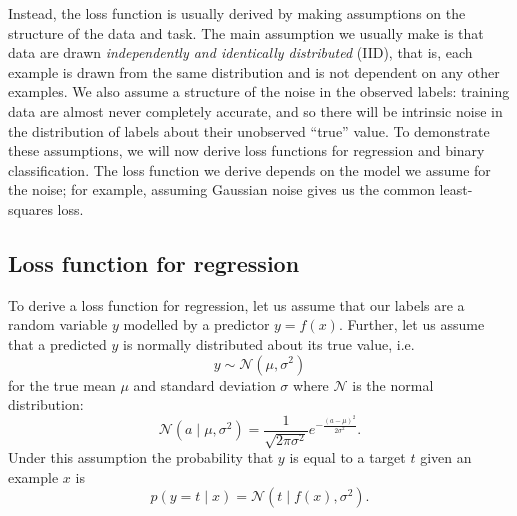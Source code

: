 \documentclass[11pt, a4paper]{book}
\newcommand{\defn}[1]{\emph{#1}}
\begin{document}
    Instead, the loss function is usually derived by making assumptions on the structure of the data and task. The main assumption we usually make is that data are drawn \defn{independently and identically distributed} (IID), that is, each example is drawn from the same distribution and is not dependent on any other examples. We also assume a structure of the noise in the observed labels: training data are almost never completely accurate, and so there will be intrinsic noise in the distribution of labels about their unobserved ``true'' value. To demonstrate these assumptions, we will now derive loss functions for regression and binary classification. The loss function we derive depends on the model we assume for the noise; for example, assuming Gaussian noise gives us the common least-squares loss.

        \subsection{Loss function for regression}
        \label{sec:loss-regression}

            To derive a loss function for regression, let us assume that our labels are a random variable $y$ modelled by a predictor $y = f(x)$. Further, let us assume that a predicted $y$ is normally distributed about its true value, i.e.
            \begin{equation}
                y \sim \mathcal N(\mu, \sigma^2)
            \end{equation}
            for the true mean $\mu$ and standard deviation $\sigma$ where $\mathcal N$ is the normal distribution:
            \begin{equation}
                \mathcal N(a \mid \mu, \sigma^2) = \frac{1}{\sqrt{2\pi\sigma^2}} e^{-\frac{(a - \mu)^2}{2\sigma^2}}.
            \end{equation}
            Under this assumption the probability that $y$ is equal to a target $t$ given an example $x$ is
            \begin{equation}
                p(y = t \mid x) = \mathcal N(t \mid f(x), \sigma^2).
            \end{equation}
\end{document}
